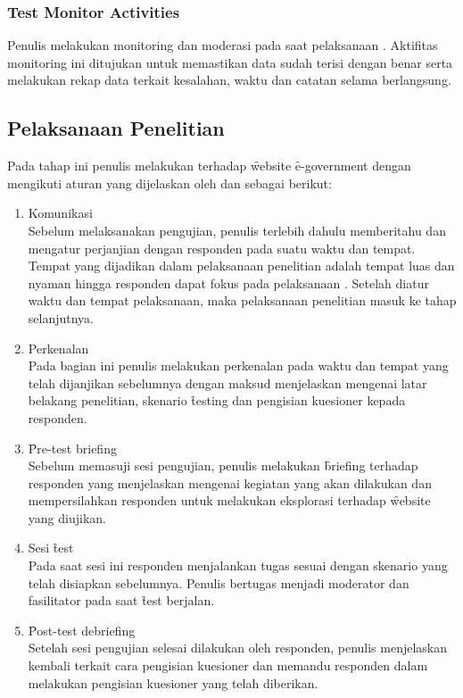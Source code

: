 \subsubsection{Test Monitor Activities}
Penulis melakukan monitoring dan moderasi pada saat pelaksanaan \ust. Aktifitas monitoring ini ditujukan untuk memastikan data sudah terisi dengan benar serta melakukan rekap data terkait kesalahan, waktu dan catatan selama \ust \space berlangsung.
\subsection{Pelaksanaan Penelitian}
Pada tahap ini penulis melakukan \ust \space terhadap \f{website} \f{e-government} dengan mengikuti aturan yang dijelaskan oleh \citet{buku.rubin} dan \citet{buku.dumas} sebagai berikut:
\begin{enumerate}
	\item Komunikasi\\
	Sebelum melaksanakan pengujian, penulis terlebih dahulu memberitahu dan mengatur perjanjian dengan responden pada suatu waktu dan tempat. Tempat yang dijadikan dalam pelaksanaan penelitian adalah tempat luas dan nyaman hingga responden dapat fokus pada pelaksanaan \ust. Setelah diatur waktu dan tempat pelaksanaan, maka pelaksanaan penelitian masuk ke tahap selanjutnya.
	\item Perkenalan\\
	Pada bagian ini penulis melakukan perkenalan pada waktu dan tempat yang telah dijanjikan sebelumnya dengan maksud menjelaskan mengenai latar belakang penelitian, skenario \f{testing} dan pengisian kuesioner kepada responden.
	\item \f{Pre-test briefing}\\
	Sebelum memasuji sesi pengujian, penulis melakukan \f{briefing} terhadap responden yang menjelaskan mengenai kegiatan yang akan dilakukan dan mempersilahkan responden untuk melakukan eksplorasi terhadap \f{website} yang diujikan.
	\item Sesi \f{test}\\
	Pada saat sesi ini responden menjalankan tugas sesuai dengan skenario yang telah disiapkan sebelumnya. Penulis bertugas menjadi moderator dan fasilitator pada saat \f{test} berjalan.
	\item \f{Post-test debriefing}\\
	Setelah sesi pengujian selesai dilakukan oleh responden, penulis menjelaskan kembali terkait cara pengisian kuesioner dan memandu responden dalam melakukan pengisian kuesioner yang telah diberikan.
\end{enumerate}
